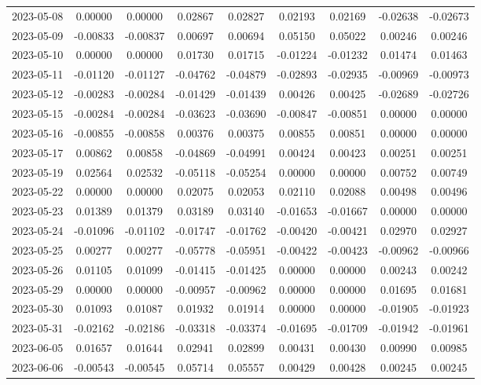 {\begin{footnotesize}
\begin{longtable}{lcccccccc}
2023-05-08 & 0.00000 & 0.00000 & 0.02867 & 0.02827 & 0.02193 & 0.02169 & -0.02638 & -0.02673 \\
2023-05-09 & -0.00833 & -0.00837 & 0.00697 & 0.00694 & 0.05150 & 0.05022 & 0.00246 & 0.00246 \\
2023-05-10 & 0.00000 & 0.00000 & 0.01730 & 0.01715 & -0.01224 & -0.01232 & 0.01474 & 0.01463 \\
2023-05-11 & -0.01120 & -0.01127 & -0.04762 & -0.04879 & -0.02893 & -0.02935 & -0.00969 & -0.00973 \\
2023-05-12 & -0.00283 & -0.00284 & -0.01429 & -0.01439 & 0.00426 & 0.00425 & -0.02689 & -0.02726 \\
2023-05-15 & -0.00284 & -0.00284 & -0.03623 & -0.03690 & -0.00847 & -0.00851 & 0.00000 & 0.00000 \\
2023-05-16 & -0.00855 & -0.00858 & 0.00376 & 0.00375 & 0.00855 & 0.00851 & 0.00000 & 0.00000 \\
2023-05-17 & 0.00862 & 0.00858 & -0.04869 & -0.04991 & 0.00424 & 0.00423 & 0.00251 & 0.00251 \\
2023-05-19 & 0.02564 & 0.02532 & -0.05118 & -0.05254 & 0.00000 & 0.00000 & 0.00752 & 0.00749 \\
2023-05-22 & 0.00000 & 0.00000 & 0.02075 & 0.02053 & 0.02110 & 0.02088 & 0.00498 & 0.00496 \\
2023-05-23 & 0.01389 & 0.01379 & 0.03189 & 0.03140 & -0.01653 & -0.01667 & 0.00000 & 0.00000 \\
2023-05-24 & -0.01096 & -0.01102 & -0.01747 & -0.01762 & -0.00420 & -0.00421 & 0.02970 & 0.02927 \\
2023-05-25 & 0.00277 & 0.00277 & -0.05778 & -0.05951 & -0.00422 & -0.00423 & -0.00962 & -0.00966 \\
2023-05-26 & 0.01105 & 0.01099 & -0.01415 & -0.01425 & 0.00000 & 0.00000 & 0.00243 & 0.00242 \\
2023-05-29 & 0.00000 & 0.00000 & -0.00957 & -0.00962 & 0.00000 & 0.00000 & 0.01695 & 0.01681 \\
2023-05-30 & 0.01093 & 0.01087 & 0.01932 & 0.01914 & 0.00000 & 0.00000 & -0.01905 & -0.01923 \\
2023-05-31 & -0.02162 & -0.02186 & -0.03318 & -0.03374 & -0.01695 & -0.01709 & -0.01942 & -0.01961 \\
2023-06-05 & 0.01657 & 0.01644 & 0.02941 & 0.02899 & 0.00431 & 0.00430 & 0.00990 & 0.00985 \\
2023-06-06 & -0.00543 & -0.00545 & 0.05714 & 0.05557 & 0.00429 & 0.00428 & 0.00245 & 0.00245 \\

\end{longtable}
\end{footnotesize}}
